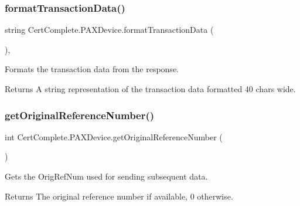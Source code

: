 \subsubsection{\texorpdfstring{format\+Transaction\+Data()}{formatTransactionData()}}
{\footnotesize\ttfamily string Cert\+Complete.\+P\+A\+X\+Device.\+format\+Transaction\+Data (\begin{DoxyParamCaption}{ }\end{DoxyParamCaption})\hspace{0.3cm}{\ttfamily [inline]}, {\ttfamily [private]}}



Formats the transaction data from the response. 

\begin{DoxyReturn}{Returns}
A string representation of the transaction data formatted 40 chars wide.
\end{DoxyReturn}
\mbox{\label{class_cert_complete_1_1_p_a_x_device_a6ae58cbf3aca1cbd8c00070343145f1b}} 
\subsubsection{\texorpdfstring{get\+Original\+Reference\+Number()}{getOriginalReferenceNumber()}}
{\footnotesize\ttfamily int Cert\+Complete.\+P\+A\+X\+Device.\+get\+Original\+Reference\+Number (\begin{DoxyParamCaption}{ }\end{DoxyParamCaption})\hspace{0.3cm}{\ttfamily [inline]}}



Gets the Orig\+Ref\+Num used for sending subsequent data. 

\begin{DoxyReturn}{Returns}
The original reference number if available, 0 otherwise.
\end{DoxyReturn}
\mbox{\label{class_cert_complete_1_1_p_a_x_device_a3869b5b02f12f7369468fcd0e3353700}} 
